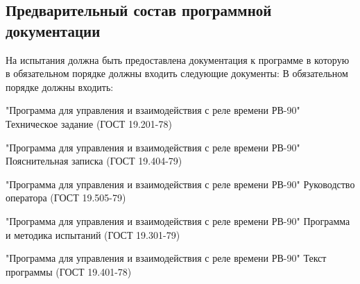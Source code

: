 \subsection{Предварительный состав программной документации}
На испытания должна быть предоставлена документация к программе в которую в обязательном порядке должны входить следующие документы:
В обязательном порядке должны входить:
\begin{my_enumerate}
\item "Программа для управления и взаимодействия с реле времени РВ-90" Техническое задание  (ГОСТ 19.201-78)
\item "Программа для управления и взаимодействия с реле времени РВ-90" Пояснительная записка  (ГОСТ 19.404-79)
\item "Программа для управления и взаимодействия с реле времени РВ-90" Руководство оператора  (ГОСТ 19.505-79)
\item "Программа для управления и взаимодействия с реле времени РВ-90" Программа и методика испытаний (ГОСТ 19.301-79)
\item "Программа для управления и взаимодействия с реле времени РВ-90" Текст программы  (ГОСТ 19.401-78)
\end{my_enumerate}

